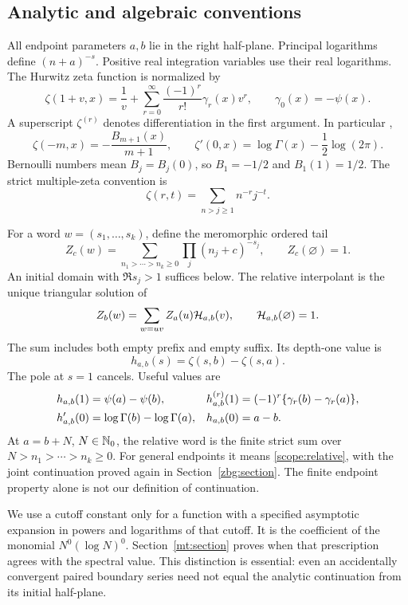 \subsection{Analytic and algebraic conventions}

All endpoint parameters $a,b$ lie in the right half-plane.
Principal logarithms define $(n+a)^{-s}$. Positive real integration
variables use their real logarithms. The Hurwitz zeta function is
normalized by
\begin{equation}\label{scope:stieltjes}
 \zeta(1+v,x)=\frac1v+
       \sum_{r=0}^{\infty}\frac{(-1)^r}{r!}\gamma_r(x)v^r,
 \qquad \gamma_0(x)=-\psi(x).
\end{equation}
A superscript $\zeta^{(r)}$ denotes differentiation in the first
argument. In particular \cite[\S25.11]{DLMFHurwitz},
\begin{equation}\label{scope:hurwitz}
 \zeta(-m,x)=-\frac{B_{m+1}(x)}{m+1},\qquad
 \zeta'(0,x)=\log\Gamma(x)-\frac12\log(2\pi).
\end{equation}
Bernoulli numbers mean $B_j=B_j(0)$, so $B_1=-1/2$ and $B_1(1)=1/2$.
The strict multiple-zeta convention is
\[
 \zeta(r,t)=\sum_{n>j\geq1}n^{-r}j^{-t}.
\]

For a word $w=(s_1,\ldots,s_k)$, define the meromorphic ordered tail
\[
 Z_c(w)=\sum_{n_1>\cdots>n_k\geq0}
                      \prod_j(n_j+c)^{-s_j},\qquad Z_c(\varnothing)=1.
\]
An initial domain with $\Re s_j>1$ suffices below. The relative
interpolant is the unique triangular solution of
\begin{equation}\label{scope:relative}
 Z_b(w)=\sum_{w=uv}Z_a(u)\mathcal H_{a,b}(v),\qquad
 \mathcal H_{a,b}(\varnothing)=1.
\end{equation}
The sum includes both empty prefix and empty suffix. Its depth-one value is
\begin{equation}\label{scope:h}
 h_{a,b}(s)=\zeta(s,b)-\zeta(s,a).
\end{equation}
The pole at $s=1$ cancels. Useful values are
\begin{align}
 h_{a,b}(1)&=\psi(a)-\psi(b),&
 h_{a,b}^{(r)}(1)&=(-1)^r\{\gamma_r(b)-\gamma_r(a)\},\label{scope:hjets}\\
 h_{a,b}'(0)&=\log\Gamma(b)-\log\Gamma(a),&
 h_{a,b}(0)&=a-b.\notag
\end{align}
At $a=b+N$, $N\in\mathbb N_0$, the relative word is the finite strict sum
over $N>n_1>\cdots>n_k\geq0$. For general endpoints it means
\eqref{scope:relative}, with the joint continuation proved again in
Section~\ref{zbg:section}. The finite endpoint property alone is not
our definition of continuation.

We use a cutoff constant only for a function with a specified asymptotic
expansion in powers and logarithms of that cutoff. It is the coefficient
of the monomial $N^0(\log N)^0$. Section~\ref{mt:section} proves when
that prescription agrees with the spectral value. This distinction
is essential: even an accidentally convergent paired boundary series
need not equal the analytic continuation from its initial half-plane.

